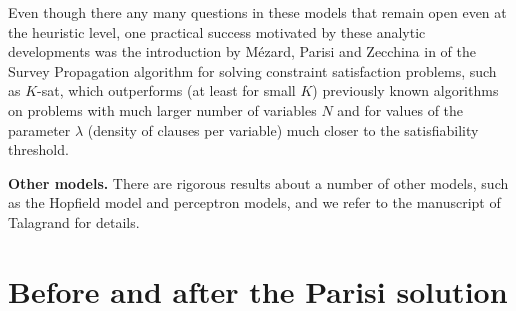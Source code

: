 \documentclass[12pt]{article}
\theoremstyle{nonumberplain}
\begin{document}
Even though there any many questions in these models that remain open even at the heuristic level, one practical success motivated by these analytic developments was the introduction by M\'ezard, Parisi and Zecchina in \cite{MPZ, MZ} of the Survey Propagation algorithm for solving constraint satisfaction problems, such as $K$-sat, which outperforms (at least for small $K$) previously known algorithms on problems with much larger number of variables $N$ and for values of the parameter $\lambda$ (density of clauses per variable) much closer to the satisfiability threshold.

\medskip
\noindent
\textbf{Other models.} There are rigorous results about a number of other models, such as the Hopfield model and perceptron models, and we refer to the manuscript of Talagrand \cite{SG2, SG2-2} for details. 



\section{Before and after the Parisi solution}\label{Sec4label}
\end{document}
